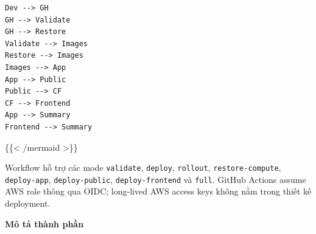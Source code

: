 \begin{verbatim}
Dev --> GH
GH --> Validate
GH --> Restore
Validate --> Images
Restore --> Images
Images --> App
App --> Public
Public --> CF
CF --> Frontend
App --> Summary
Frontend --> Summary
\end{verbatim}

\{\{\textless{} /mermaid \textgreater\}\}

Workflow hỗ trợ các mode \texttt{validate}, \texttt{deploy},
\texttt{rollout}, \texttt{restore-\allowbreak{}compute}, \texttt{deploy-\allowbreak{}app},
\texttt{deploy-\allowbreak{}public}, \texttt{deploy-\allowbreak{}frontend} và \texttt{full}.
GitHub Actions assume AWS role thông qua OIDC; long-lived AWS access
keys không nằm trong thiết kế deployment.

\vspace{0.5em}\noindent\textbf{Mô tả thành phần}\par

